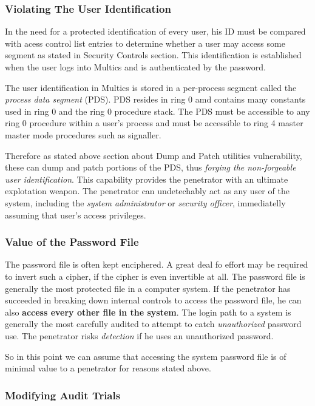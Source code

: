 \subsubsection{Violating The User Identification}

In the need for a protected identification of every user, his ID must be compared with acess control list entries 
to determine whether a user may access some segment as stated in Security Controls section.
This identification is established when the user logs into Multics and is authenticated by the password.

The user identification in Multics is stored in a per-process segment called the \textit{process data segment} (PDS).
PDS resides in ring 0 amd contains many constants used in ring 0 and the ring 0 procedure stack. The PDS must be 
accessible to any ring 0 procedure within a user's process and must be accessible to ring 4 master master mode 
procedures such as signaller.

Therefore as stated above section about Dump and Patch utilities vulnerability, these can dump and patch portions of the 
PDS, thus \textit{forging the non-forgeable user identification}.
This capability provides the penetrator with an ultimate explotation weapon. The penetrator can undetechably act as any 
user of the system, including the \textit{system administrator} or \textit{security officer}, immediatelly assuming that 
user's access privileges.

\subsubsection{Value of the Password File}

The password file is often kept enciphered. A great deal fo effort may be required to invert such a cipher, if the cipher 
is even invertible at all.
The password file is generally the most protected file in a computer system. If the penetrator has succeeded in breaking 
down internal controls to access the password file, he can also \textbf{access every other file in the system}.
The login path to a system is generally the most carefully audited to attempt to catch \textit{unauthorized} password use.
The penetrator risks \textit{detection} if he uses an unauthorized password.

So in this point we can assume that accessing the system password file is of minimal value to a penetrator for reasons 
stated above.

\subsubsection{Modifying Audit Trials}

